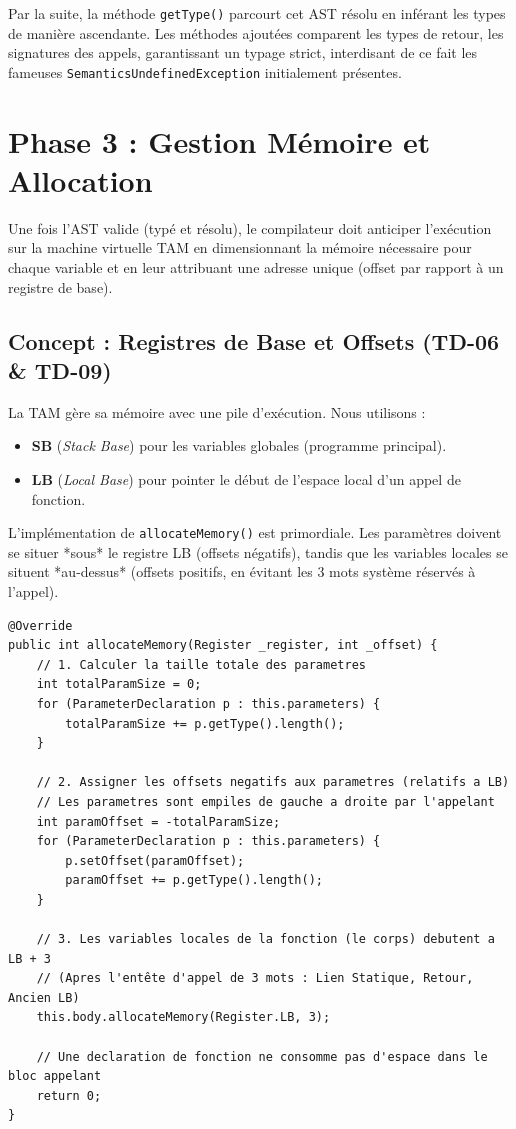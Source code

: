 \documentclass[12pt,a4paper]{article}
\begin{document}
Par la suite, la méthode \texttt{getType()} parcourt cet AST résolu en inférant les types de manière ascendante. Les méthodes ajoutées comparent les types de retour, les signatures des appels, garantissant un typage strict, interdisant de ce fait les fameuses \texttt{SemanticsUndefinedException} initialement présentes.

\newpage
\section{Phase 3 : Gestion Mémoire et Allocation}

Une fois l'AST valide (typé et résolu), le compilateur doit anticiper l'exécution sur la machine virtuelle TAM en dimensionnant la mémoire nécessaire pour chaque variable et en leur attribuant une adresse unique (offset par rapport à un registre de base).

\subsection{Concept : Registres de Base et Offsets (TD-06 \& TD-09)}
La TAM gère sa mémoire avec une pile d'exécution. Nous utilisons :
\begin{itemize}
    \item \textbf{SB} (\textit{Stack Base}) pour les variables globales (programme principal).
    \item \textbf{LB} (\textit{Local Base}) pour pointer le début de l'espace local d'un appel de fonction.
\end{itemize}

L'implémentation de \texttt{allocateMemory()} est primordiale. Les paramètres doivent se situer *sous* le registre LB (offsets négatifs), tandis que les variables locales se situent *au-dessus* (offsets positifs, en évitant les 3 mots système réservés à l'appel).

\begin{lstlisting}[caption={Extrait de FunctionDeclaration.java - Allocation mémoire}]
@Override
public int allocateMemory(Register _register, int _offset) {
    // 1. Calculer la taille totale des parametres
    int totalParamSize = 0;
    for (ParameterDeclaration p : this.parameters) {
        totalParamSize += p.getType().length();
    }
    
    // 2. Assigner les offsets negatifs aux parametres (relatifs a LB)
    // Les parametres sont empiles de gauche a droite par l'appelant
    int paramOffset = -totalParamSize;
    for (ParameterDeclaration p : this.parameters) {
        p.setOffset(paramOffset);
        paramOffset += p.getType().length();
    }
    
    // 3. Les variables locales de la fonction (le corps) debutent a LB + 3
    // (Apres l'entête d'appel de 3 mots : Lien Statique, Retour, Ancien LB)
    this.body.allocateMemory(Register.LB, 3);
    
    // Une declaration de fonction ne consomme pas d'espace dans le bloc appelant
    return 0;
}
\end{lstlisting}
\end{document}
